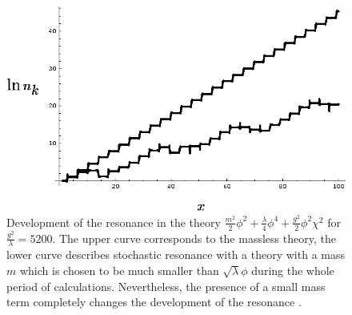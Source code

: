 \documentclass[11pt,a4paper,twoside]{book}
\begin{document}
\begin{figure}
	\centering
	\includegraphics[width=0.6\linewidth, height=0.3\textheight]{Images/Chap4/ConformalTheory_Fig9}
	\caption{Development of the resonance in the theory $ \frac{m^{2}}{2}\phi^{2} + \frac{\lambda}{4}\phi^{4} + \frac{g^{2}}{2}\phi^{2}\chi^{2} $ for $ \frac{g^{2}}{\lambda}=5200 $. The upper curve corresponds to the massless theory, the lower curve describes stochastic resonance  with a theory with a mass $ m $ which is chosen to be much smaller than $ \sqrt{\lambda}\phi $ during the whole period of calculations. Nevertheless, the presence of a small mass term completely changes the development of the resonance \cite{Chap4:ModelLambdaPhi4Reference}.}
	\label{fig:conformaltheoryfig9}
\end{figure}
\end{document}
